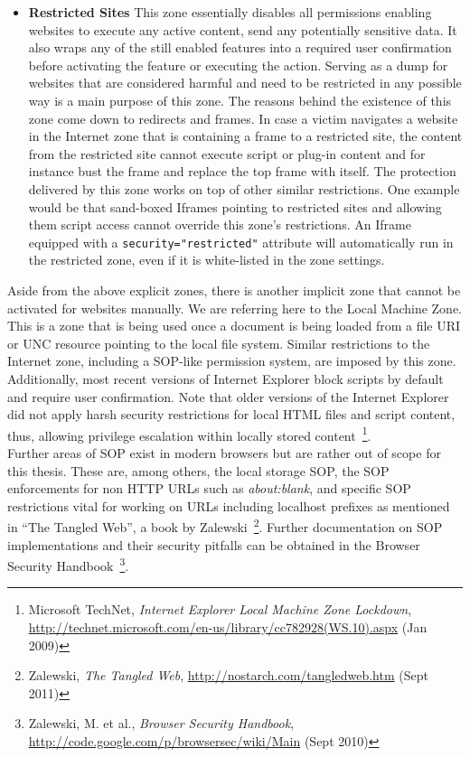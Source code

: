 \begin{itemize}
	  \item \textbf{Restricted Sites} This zone essentially disables all permissions enabling websites to execute any active content, send any potentially sensitive data. It also wraps any of the still enabled features into a required user confirmation before activating the feature or executing the action. Serving as a dump for websites that are considered harmful and need to be restricted in any possible way is a main purpose of this zone. The reasons behind the existence of this zone come down to redirects and frames. In case a victim navigates a website in the Internet zone that is containing a frame to a restricted site, the content from the restricted site cannot execute script or plug-in content and for instance bust the frame and replace the top frame with itself. The protection delivered by this zone works on top of other similar restrictions. One example would be that sand-boxed Iframes pointing to restricted sites and allowing them script access cannot override this zone's restrictions. An Iframe 
equipped with a \texttt{security="restricted"} attribute will automatically run in the restricted zone, even if it is white-listed in the zone settings.
	\end{itemize}

	Aside from the above explicit zones, there is another implicit zone that cannot be activated for websites manually. We are referring here to the Local Machine Zone. This is a zone that is being used once a document is being loaded from a file URI or UNC resource pointing to the local file system. Similar restrictions to the Internet zone, including a SOP-like permission system, are imposed by this zone. Additionally, most recent versions of Internet Explorer block scripts by default and require user confirmation. Note that older versions of the Internet Explorer did not apply harsh security restrictions for local HTML files and script content, thus, allowing privilege escalation within locally stored content~\footnote{Microsoft TechNet, \textit{Internet Explorer Local Machine Zone Lockdown}, \url{http://technet.microsoft.com/en-us/library/cc782928(WS.10).aspx} (Jan 2009)}. \\

	Further areas of SOP exist in modern browsers but are rather out of scope for this thesis. These are, among others, the local storage SOP, the SOP enforcements for non HTTP URLs such as \textit{about:blank}, and specific SOP restrictions vital for working on URLs including localhost prefixes as mentioned in ``The Tangled Web'', a book by Zalewski~\footnote{Zalewski, \textit{The Tangled Web}, \url{http://nostarch.com/tangledweb.htm} (Sept 2011)}. Further documentation on SOP implementations and their security pitfalls can be obtained in the Browser Security Handbook~\footnote{Zalewski, M. et al., \textit{Browser Security Handbook}, \url{http://code.google.com/p/browsersec/wiki/Main} (Sept 2010)}.
      
